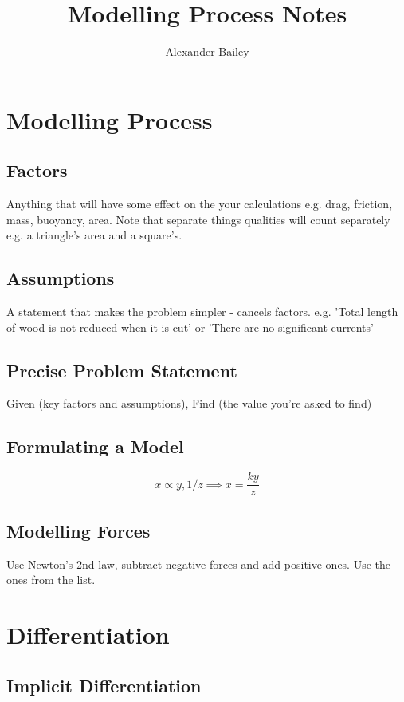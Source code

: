 \documentclass[12pt] {article}
\begin{document}
\title{Modelling Process Notes}
\author{Alexander Bailey}
\maketitle

\section{Modelling Process}
\subsection*{Factors}
Anything that will have some effect on the your calculations e.g. drag, friction, mass, buoyancy, area.
Note that separate things qualities will count separately e.g. a triangle's area and a square's.

\subsection*{Assumptions}
A statement that makes the problem simpler - cancels factors. 
e.g. 'Total length of wood is not reduced when it is cut'
or 'There are no significant currents' 

\subsection*{Precise Problem Statement}
Given (key factors and assumptions), Find (the value you're asked to find)

\subsection*{Formulating a Model}
\begin{equation*}
x \propto y,1/z \implies x = \frac{ky}{z} 
\end{equation*}

\subsection*{Modelling Forces}
Use Newton's 2nd law, subtract negative forces and add positive ones. Use the ones from the list.

\section{Differentiation}
\subsection*{Implicit Differentiation}
\end{document}
